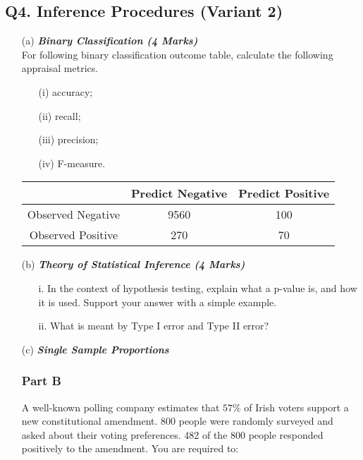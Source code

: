 \documentclass[]{article}
\begin{document}
\subsection*{Q4. Inference Procedures (Variant 2)}

\begin{itemize}
\item[(a)] \textbf{\textit{Binary Classification (4 Marks)}}\\
For following binary classification outcome table, calculate the following appraisal metrics.
\begin{itemize}
\item[(i)] accuracy;
\item[(ii)] recall;
\item[(iii)] precision;
\item[(iv)] F-measure.
\end{itemize}

\begin{center}
\begin{tabular}{|c|c|c|}
\hline  & \phantom{spa}Predict Negative\phantom{spa} & \phantom{spa}Predict Positive\phantom{spa} \\ 
\hline\phantom{spa} Observed Negative \phantom{spa}&9560&100\\ 
\hline \phantom{spa}Observed Positive\phantom{spa} & 270&70\\ 
\hline 
\end{tabular} 
\end{center}

\item[(b)] \textbf{\textit{Theory of Statistical Inference (4 Marks)}}\\
\begin{itemize}
\item[i.] In the context of hypothesis testing, explain what a p-value is, and how it is used. Support your answer with a simple example.
\item[ii.] What is meant by Type I error and Type II error?
\end{itemize}

\item[(c)] \textbf{\textit{Single Sample Proportions }}\\
\subsubsection*{Part B} %
A well-known polling company estimates that $57\%$ of Irish voters support a new constitutional amendment. 800 people were randomly surveyed and asked about their voting preferences. 482 of the 800 people responded positively to the amendment. You are required to:


\end{itemize}
\end{document}
